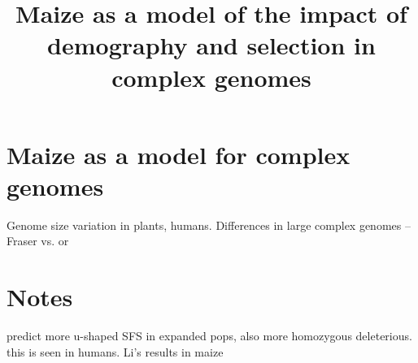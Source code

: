 \documentclass[12pt]{article}
\begin{document}
\title{\vspace{-5ex}Maize as a model of the impact of demography and selection in complex genomes\vspace{-4ex}}
\author{}
\date{}
\maketitle

\section*{Maize as a model for complex genomes}

Genome size variation in plants, humans. 
Differences in large complex genomes -- Fraser \citep{fraser2013gene} vs. \citep{pyhajarvi2013complex} or \citep{hancock2011adaptation}

\section*{Notes}

\citep{peischl2015expansion} predict more u-shaped SFS in expanded pops, also more homozygous deleterious. this is seen in humans. Li's results in maize




%
%





\newpage

\end{document}
